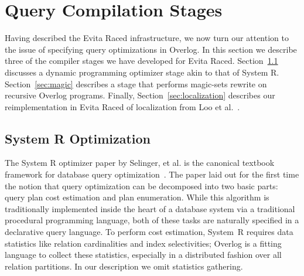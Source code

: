 \documentclass{sigmod08}
\newcommand{\ol}[1]{\texttt{\small #1}\xspace}
\begin{document}
\section{Query Compilation Stages}
\label{sec:rewrite}

Having described the Evita Raced infrastructure, we now turn our
attention to the issue of specifying query optimizations in Overlog.  In
this section we  describe three of the compiler stages we have developed
for Evita Raced. 
Section~\ref{sec:systemr} discusses a dynamic programming optimizer stage akin to that of
System R. Section~\ref{sec:magic} describes a stage that performs 
magic-sets rewrite on recursive Overlog programs.
Finally, Section~\ref{sec:localization} describes our
reimplementation in Evita Raced of localization  from Loo et
al.~\cite{loo-sigmod06}. 

\subsection{System R Optimization}
\label{sec:systemr}

The System R optimizer paper by Selinger, et al. is the canonical textbook framework for database query optimization~\cite{selinger}.  The paper laid out for
the first time the notion that query optimization can be decomposed
into two basic parts: query plan cost
estimation and plan enumeration.  While this algorithm is traditionally implemented inside
the heart of a database system via a traditional procedural
programming language, both of these tasks are
naturally specified in a declarative query language.  To perform cost
estimation, System~R requires data statistics like relation
cardinalities and index selectivities; Overlog is a fitting language to
collect these statistics, especially in a distributed fashion over all
relation partitions. In our description we omit statistics gathering.
\end{document}
